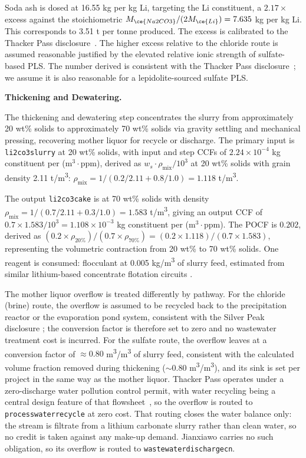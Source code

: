 \documentclass{article}
\renewcommand\_{\textunderscore\allowbreak}
\begin{document}
Soda ash is dosed at 16.55 kg  per kg Li, targeting the Li constituent, a $2.17\times$ excess against the stoichiometric $M_{\ce{Na2CO3}}/(2M_{\ce{Li}}) = 7.635$ kg  per kg Li. This corresponds to 3.51 t  per tonne  produced. The excess is calibrated to the Thacker Pass disclosure~\cite{sgscanadaincSK1300Technical2024}. The higher excess relative to the chloride route is assumed reasonable justified by the elevated relative ionic strength of sulfate-based PLS. The number derived is consistent with the Thacker Pass disclosure~\cite{sgscanadaincSK1300Technical2024}; we assume it is also reasonable for a lepidolite-sourced sulfate PLS.

\medskip
\noindent\textbf{Thickening and Dewatering.}\quad

The thickening and dewatering step concentrates the  slurry from approximately 20 wt\% solids to approximately 70 wt\% solids via gravity settling and mechanical pressing, recovering mother liquor for recycle or discharge. The primary input is \texttt{li2co3\_slurry} at 20 wt\% solids, with input and step CCFs of $2.24 \times 10^{-4}$ kg constituent per (m$^3 \cdot$ppm), derived as $w_s \cdot \rho_\text{mix} / 10^3$ at 20 wt\% solids with  grain density 2.11 \si{t/m^3}: $\rho_\text{mix} = 1/(0.2/2.11 + 0.8/1.0) = 1.118$ \si{t/m^3}.
 
The output \texttt{li2co3\_cake} is at 70 wt\% solids with density $\rho_\text{mix} = 1/(0.7/2.11 + 0.3/1.0) = 1.583$ \si{t/m^3}, giving an output CCF of $0.7 \times 1.583 / 10^3 = 1.108 \times 10^{-3}$ kg constituent per (m$^3 \cdot$ppm). The POCF is $0.202$, derived as $(0.2 \times \rho_{20\%}) / (0.7 \times \rho_{70\%}) = (0.2 \times 1.118) / (0.7 \times 1.583)$, representing the volumetric contraction from 20 wt\% to 70 wt\% solids. One reagent is consumed: flocculant at 0.005 \si{kg/m^3} of slurry feed, estimated from similar lithium-based concentrate flotation circuits \cite{opokuOverviewCoarseParticle2025, tramflocPolymersWaterWastewater2013}. 
 
The mother liquor overflow is treated differently by pathway. For the chloride (brine) route, the overflow is assumed to be recycled back to the precipitation reactor or the evaporation pond system, consistent with the Silver Peak  disclosure \cite{srkconsultingSECTechnicalReport2023a}; the conversion factor is therefore set to zero and no wastewater treatment cost is incurred. For the sulfate route, the overflow leaves at a conversion factor of $\approx 0.80$ \si{m^3/m^3} of slurry feed, consistent with the calculated volume fraction removed during thickening ($\sim$0.80 \si{m^3/m^3}), and its sink is set per project in the same way as the mother liquor. Thacker Pass operates under a zero-discharge water pollution control permit, with water recycling being a central design feature of that flowsheet~\cite{sgscanadaincSK1300Technical2024}, so the overflow is routed to \texttt{process\_water\_recycle} at zero cost. That routing closes the water balance only: the stream is filtrate from a lithium carbonate slurry rather than clean water, so no credit is taken against any make-up demand. Jianxiawo carries no such obligation, so its overflow is routed to \texttt{wastewater\_discharge\_cn}.
\end{document}
